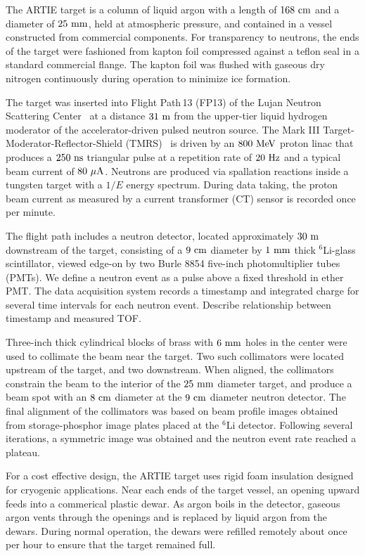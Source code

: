 \documentclass[%
 reprint,
superscriptaddress,
 preprintnumbers,
 nofootinbib,
 nobibnotes,
 bibnotes,
 amsmath,amssymb,
 aps,
 prl, 
 floatfix,
]{revtex4-1}
\newcommand{\MeV}{\mathrm{Me\kern -0.1em V}}
\begin{document}
The ARTIE target is a column of liquid argon with a length of $168~\rm
cm$ and a diameter of $25~\rm mm$, held at atmospheric pressure, and
contained in a vessel constructed from commercial components.  For
transparency to neutrons, the ends of the target were fashioned from
kapton foil compressed against a teflon seal in a standard commercial
flange.  The kapton foil was flushed with gaseous dry nitrogen
continuously during operation to minimize ice formation.

The target was inserted into Flight Path\,13 (FP13) of the Lujan
Neutron Scattering Center~\cite{LANSCEBeam:1990} at a distance $31~\rm
m$ from the upper-tier liquid hydrogen moderator of the
accelerator-driven pulsed neutron source. The Mark III
Target-Moderator-Reflector-Shield (TMRS)~\cite{moderator} is driven by
an $800~\MeV$ proton linac that produces a $250~\rm ns$ triangular
pulse at a repetition rate of $20~\rm Hz$ and a typical beam current
of $80~\rm \mu A$. Neutrons are produced via spallation reactions
inside a tungsten target with a $1/E$ energy spectrum.  During data
taking, the proton beam current as measured by a current transformer
(CT) sensor is recorded once per minute.

The flight path includes a neutron detector, located approximately
$30~\rm m$ downstream of the target, consisting of a $9~\rm cm$
diameter by $1~\rm mm$ thick $^6$Li-glass scintillator, viewed edge-on
by two Burle 8854 five-inch photomultiplier tubes (PMTs).  We define a
neutron event as a pulse above a fixed threshold in ether PMT.  The
data acquisition system records a timestamp and integrated charge for
several time intervals for each neutron event.  {\color{red} Describe
  relationship between timestamp and measured TOF.}

Three-inch thick cylindrical blocks of brass with $6~\rm mm$ holes in
the center were used to collimate the beam near the target.  Two such
collimators were located upstream of the target, and two downstream.
When aligned, the collimators constrain the beam to the interior of
the $25~\rm mm$ diameter target, and produce a beam spot with an
$8~\rm cm$ diameter at the $9~\rm cm$ diameter neutron detector.  The
final alignment of the collimators was based on beam profile images
obtained from storage-phosphor image plates placed at the $^{6}$Li
detector.  Following several iterations, a symmetric image was
obtained and the neutron event rate reached a plateau.

For a cost effective design, the ARTIE target uses rigid foam
insulation designed for cryogenic applications.  Near each ends of the
target vessel, an opening upward feeds into a commerical plastic
dewar.  As argon boils in the detector, gaseous argon vents through
the openings and is replaced by liquid argon from the dewars.  During
normal operation, the dewars were refilled remotely about once per
hour to ensure that the target remained full.
\end{document}
